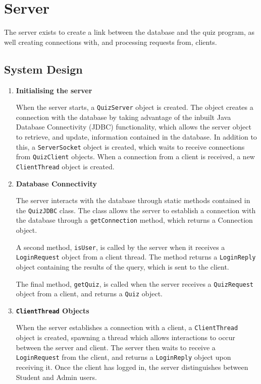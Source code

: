 \section{Server}
\label{sec:server}

The server exists to create a link between the database and the quiz program,
as well creating connections with, and processing requests from, clients.

\subsection{System Design}
\label{sub:system_design}

\begin{enumerate}
	\item \textbf{Initialising the server}

	When the server starts, a \texttt{QuizServer} object is created. The object
	creates a connection with the database by taking advantage of the inbuilt 
        Java Database Connectivity (JDBC) functionality, which allows the server 
        object to retrieve, and update, information contained in the database. In 
        addition to this, a \texttt{ServerSocket} object is created, which waits to
        receive connections from \texttt{QuizClient} objects. When a connection from 
        a client is received, a new \texttt{ClientThread} object is created.

	\item \textbf{Database Connectivity}

	The server interacts with the database through static methods contained in
	the \texttt{QuizJDBC} class.  The class allows the server to establish a
	connection with the database through a \texttt{getConnection} method, which
	returns a Connection object.

	A second method, \texttt{isUser}, is called by the server when it receives
	a \texttt{LoginRequest} object from a client thread. The method returns a
	\texttt{LoginReply} object containing the results of the query, which is
	sent to the client.

	The final method, \texttt{getQuiz}, is called when the server receives a
	\texttt{QuizRequest} object from a client, and returns a \texttt{Quiz}
	object.

	\item \textbf{\texttt{ClientThread} Objects}

	When the server establishes a connection with a client, a
	\texttt{ClientThread} object is created, spawning a thread which allows
	interactions to occur between the server and  client. The server then waits
	to receive a \texttt{LoginRequest} from the client, and returns a
	\texttt{LoginReply} object upon receiving it.  Once the client has logged in,
	the server distinguishes between Student and Admin users.


\end{enumerate}
